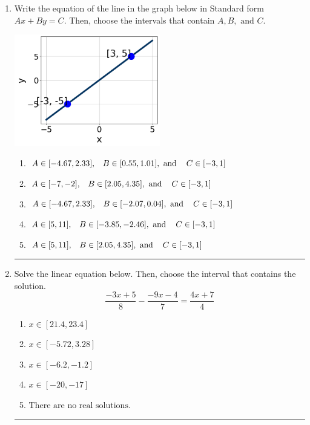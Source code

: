 \documentclass[14pt]{extbook}
\newcommand{\litem}[1]{\item#1\hspace*{-1cm}\rule{\textwidth}{0.4pt}}
\begin{document}
\begin{enumerate}
{\begin{enumerate}[label=\Alph*.]
\end{enumerate} }
\litem{
Write the equation of the line in the graph below in Standard form $Ax+By=C$. Then, choose the intervals that contain $A, B, \text{ and } C$.
\begin{center}
    \includegraphics[width=0.5\textwidth]{../Figures/linearGraphToStandardCopyC.png}
\end{center}
\begin{enumerate}[label=\Alph*.]
\item \( A \in [-4.67, 2.33], \hspace{3mm} B \in [0.55, 1.01], \text{ and } \hspace{3mm} C \in [-3, 1] \)
\item \( A \in [-7, -2], \hspace{3mm} B \in [2.05, 4.35], \text{ and } \hspace{3mm} C \in [-3, 1] \)
\item \( A \in [-4.67, 2.33], \hspace{3mm} B \in [-2.07, 0.04], \text{ and } \hspace{3mm} C \in [-3, 1] \)
\item \( A \in [5, 11], \hspace{3mm} B \in [-3.85, -2.46], \text{ and } \hspace{3mm} C \in [-3, 1] \)
\item \( A \in [5, 11], \hspace{3mm} B \in [2.05, 4.35], \text{ and } \hspace{3mm} C \in [-3, 1] \)

\end{enumerate} }
\litem{
Solve the linear equation below. Then, choose the interval that contains the solution.\[ \frac{-3x + 5}{8} - \frac{-9x -4}{7} = \frac{4x + 7}{4} \]\begin{enumerate}[label=\Alph*.]
\item \( x \in [21.4, 23.4] \)
\item \( x \in [-5.72, 3.28] \)
\item \( x \in [-6.2, -1.2] \)
\item \( x \in [-20, -17] \)
\item \( \text{There are no real solutions.} \)


\end{enumerate}}
\end{enumerate}
\end{document}
